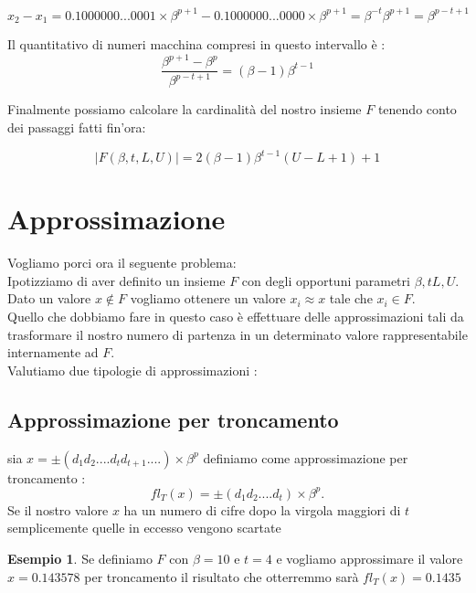 \documentclass[12pt, a4paper]{book}
\theoremstyle{definition}
\newtheorem{exmp}{Esempio}[section]
\begin{document}
\begin{flushleft}
\[ x_{2} - x_{1} = 0.1000000...0001 \times \beta^{p+1} - 0.1000000...0000 \times \beta^{p+1} = \beta^{-t}\beta^{p+1} = \beta^{p-t+1} \]

Il quantitativo di numeri macchina compresi in questo intervallo è : 
\[ \frac{\beta^{p+1} - \beta^{p}}{\beta^{p-t+1}}  =(\beta-1)\beta^{t-1}\]

Finalmente possiamo calcolare la cardinalità del nostro insieme $F$ tenendo conto dei passaggi fatti fin'ora: 

\[ |F(\beta, t, L,U)| = 2(\beta-1)\beta^{t-1}(U-L+1) + 1\]


\end{flushleft}

\section{Approssimazione}
\begin{flushleft}
Vogliamo porci ora il seguente problema: \\
Ipotizziamo di aver definito un insieme $F$ con degli opportuni parametri $\beta, t L,U$. Dato un valore $x \notin F$ vogliamo ottenere un valore $x_{i} \approx x$ tale che $x_{i} \in F$.\\
Quello che dobbiamo fare in questo caso è effettuare delle approssimazioni tali da trasformare il nostro numero di partenza in un determinato valore rappresentabile internamente ad $F$. \\
Valutiamo due tipologie di approssimazioni : 
\end{flushleft}

\subsection{Approssimazione per troncamento}
\begin{flushleft}
sia $x = \pm(d_{1}d_{2}....d_{t}d_{t+1}....)\times \beta^{p}$ definiamo come approssimazione per troncamento : 
\[ 
	fl_{T}(x) = \pm(d_{1}d_{2}....d_{t})\times \beta^{p}.
\]
Se il nostro valore $x$ ha un numero di cifre dopo la virgola maggiori di $t$ semplicemente quelle in eccesso vengono scartate

\begin{exmp}
Se definiamo $F$ con $\beta = 10 $ e $t = 4$ e vogliamo approssimare il valore $x = 0.143578$ per troncamento il risultato che otterremmo sarà $ fl_{T}(x) = 0.1435 $
\end{exmp}
\end{flushleft}
\end{document}
